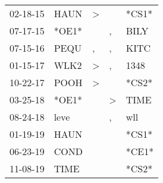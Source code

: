 \begin{supertabular}{p{0.07\textwidth}p{0.06\textwidth}p{0.02\textwidth}p{0.02\textwidth}p{0.06\textwidth}}
 02-18-15\textsuperscript{} &           HAUN\textsuperscript{} &     \textgreater &               &                            *CS1* \\
 07-17-15\textsuperscript{} &                            *OE1* &                  &             , &           BILY\textsuperscript{} \\
 07-15-16\textsuperscript{} &           PEQU\textsuperscript{} &                , &             , &           KITC\textsuperscript{} \\
 01-15-17\textsuperscript{} &           WLK2\textsuperscript{} &     \textgreater &             , &           1348\textsuperscript{} \\
 10-22-17\textsuperscript{} &           POOH\textsuperscript{} &     \textgreater &               &                            *CS2* \\
 03-25-18\textsuperscript{} &                            *OE1* &                  &  \textgreater &           TIME\textsuperscript{} \\
 08-24-18\textsuperscript{} &           leve\textsuperscript{} &                  &             , &            wll\textsuperscript{} \\
 01-19-19\textsuperscript{} &           HAUN\textsuperscript{} &                  &               &                            *CS1* \\
 06-23-19\textsuperscript{} &           COND\textsuperscript{} &                  &               &                            *CE1* \\
 11-08-19\textsuperscript{} &           TIME\textsuperscript{} &                  &               &                            *CS2* \\
\end{supertabular}
